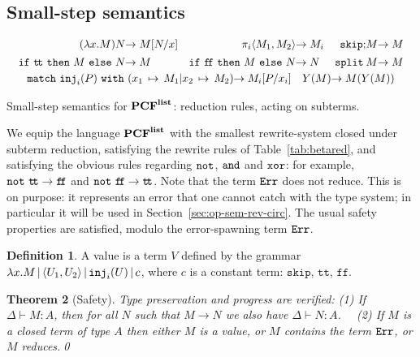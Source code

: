 \documentclass{article}
\theoremstyle{plain}
\newtheorem{theorem}{Theorem}
\theoremstyle{definition}
\newtheorem{definition}[theorem]{Definition}
\newcommand{\PCF}{\mbox{${\bf PCF}^{\bf list}$}}
\newcommand{\bor}{\,{|}\,}
\newcommand{\punit}{\mathtt{skip}}\newcommand{\prodterm}[1]{{\langle{#1}\rangle}}
\newcommand{\letunitterm}[2]{{#1}\mathtt{;}{#2}}
\newcommand{\ttrue}{\mathtt{t\!t}}
\newcommand{\ffalse}{\mathtt{f\!f}}
\newcommand{\iftermx}[3]{{{\mathtt{if}}~{#1}~\mathtt{then}~{#2}~\mathtt{else}~{#3}}}
\newcommand{\inj}{{\tt inj}}
\newcommand{\match}[5]{{{\mathtt{match}}~{#1}~{\mathtt{with}}~({#2\,\mapsto\,#3}\vert{#4\,\mapsto\,#5})}}
\newcommand{\errorlist}{{\tt Err}}
\newcommand{\splitlist}[1][]{{\mathtt{split}^{#1}}}
\begin{document}
\subsection{Small-step semantics}
\label{sec:betared}

\begin{table}[tb]
  \[
    \begin{array}{c}
    \begin{array}{r@{}lr@{}lr@{}l}
    (\lambda x.M)N &\to M{[}N/x{]}
    &
    \pi_i\prodterm{M_1,M_2} &\to M_i
    &
    \letunitterm{\punit}{M}
    &\to M
    \\[1ex]
    \iftermx{\ttrue}{M}{N}
    &\to M
    &
    \iftermx{\ffalse}{M}{N}
    &\to N
    &
    \splitlist\,M &\to M
    \end{array}
    \\[2.5ex]
    \begin{array}{r@{}lr@{}l}
    \match{\inj_i(P)}{x_1}{M_1}{x_2}{M_2}
    &\to
    M_i{[}P/x_i{]}
    &
    Y(M)
    &\to
    M(Y(M))
    \end{array}
    \end{array}
    \]
  \caption{Small-step semantics for \PCF{}: reduction rules, acting on
    subterms.}\label{tab:betared}
\end{table}


We equip the language \PCF{} with the smallest rewrite-system closed
under subterm reduction, satisfying the rewrite rules of
Table~\ref{tab:betared}, and satisfying the obvious rules regarding
${\tt not}$, ${\tt and}$ and ${\tt xor}$: for example, ${\tt not}~\ttrue\to
\ffalse$ and ${\tt not}~\ffalse\to \ttrue$.  Note that the term
$\errorlist$ does not reduce. This is on purpose: it represents an
error that one cannot catch with the type system; in particular it
will be used in Section~\ref{sec:op-sem-rev-circ}.
The usual safety properties are satisfied, modulo the error-spawning
term $\errorlist$.

\begin{definition}
  A value is a term $V$ defined by the grammar $\lambda x.M\bor
  \prodterm{U_1,U_2}\bor \inj_i(U) \bor c$, where $c$ is
  a constant term: $\punit$, $\ttrue$, $\ffalse$.
\end{definition}

\begin{theorem}[Safety]
  Type preservation and progress are verified:
  (1) If $\Delta\vdash M:A$, then for all $N$ such that $M\to N$ we
    also have
    $\Delta\vdash N:A$.~~
  (2) If $M$ is a closed term of type $A$ then either $M$ is a
    value, or $M$ contains the term $\errorlist$, or $M$
    reduces.\qed
\end{theorem}
\end{document}

